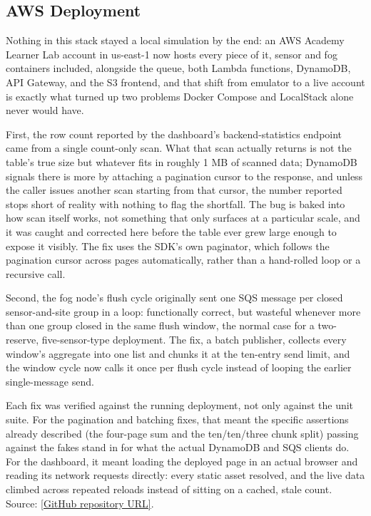 \documentclass[conference,a4paper]{IEEEtran}
\begin{document}
\subsection{AWS Deployment}

Nothing in this stack stayed a local simulation by the end: an AWS Academy Learner Lab account in us-east-1 now hosts every piece of it, sensor and fog containers included, alongside the queue, both Lambda functions, DynamoDB, API Gateway, and the S3 frontend, and that shift from emulator to a live account is exactly what turned up two problems Docker Compose and LocalStack alone never would have.

First, the row count reported by the dashboard's backend-statistics endpoint came from a single count-only scan. What that scan actually returns is not the table's true size but whatever fits in roughly 1 MB of scanned data; DynamoDB signals there is more by attaching a pagination cursor to the response, and unless the caller issues another scan starting from that cursor, the number reported stops short of reality with nothing to flag the shortfall. The bug is baked into how scan itself works, not something that only surfaces at a particular scale, and it was caught and corrected here before the table ever grew large enough to expose it visibly. The fix uses the SDK's own paginator, which follows the pagination cursor across pages automatically, rather than a hand-rolled loop or a recursive call.

Second, the fog node's flush cycle originally sent one SQS message per closed sensor-and-site group in a loop: functionally correct, but wasteful whenever more than one group closed in the same flush window, the normal case for a two-reserve, five-sensor-type deployment. The fix, a batch publisher, collects every window's aggregate into one list and chunks it at the ten-entry send limit, and the window cycle now calls it once per flush cycle instead of looping the earlier single-message send.

Each fix was verified against the running deployment, not only against the unit suite. For the pagination and batching fixes, that meant the specific assertions already described (the four-page sum and the ten/ten/three chunk split) passing against the fakes stand in for what the actual DynamoDB and SQS clients do. For the dashboard, it meant loading the deployed page in an actual browser and reading its network requests directly: every static asset resolved, and the live data climbed across repeated reloads instead of sitting on a cached, stale count. Source: \href{[GitHub repository URL]}{[GitHub repository URL]}.
\end{document}
